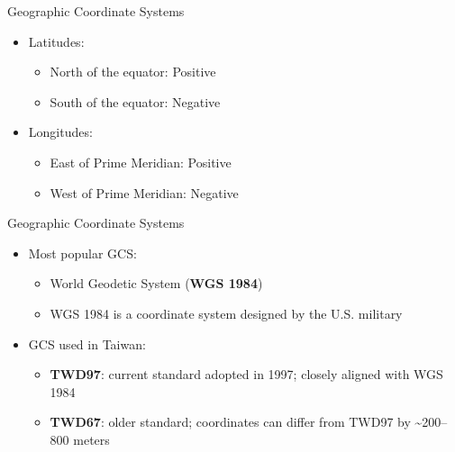 \documentclass[dvipsnames,hyperref={pdfpagelabels=false}]{beamer}
\begin{document}
\begin{frame}{Geographic Coordinate Systems}
	\begin{itemize}
		
		\item Latitudes:
		\vspace{0.2cm}
		\begin{itemize}
			\item North of the equator: Positive
			\vspace{0.2cm}
			\item South of the equator: Negative
		\end{itemize}
		\vspace{0.2cm}
		\item Longitudes:
		\vspace{0.2cm}
		\begin{itemize}
			\item East of Prime Meridian: Positive
			\vspace{0.2cm}
			\item West of Prime Meridian: Negative
		\end{itemize}
		
	\end{itemize}
\end{frame}
 
 
 
 
\begin{frame}{Geographic Coordinate Systems}
	\begin{itemize}
		
		\item Most popular GCS: 
		\begin{itemize}
			\vspace{0.2cm}
			\item World Geodetic System (\textbf{WGS 1984})
			\vspace{0.2cm}
			\item WGS 1984 is a coordinate system designed by the U.S. military
		\end{itemize}
		\vspace{0.2cm}
		\item GCS used in Taiwan:
		\vspace{0.2cm}
		\begin{itemize}
			\item \textbf{TWD97}: current standard adopted in 1997; closely aligned with WGS 1984 
			\vspace{0.2cm}
			\item \textbf{TWD67}: older standard; coordinates can differ from TWD97 by \textasciitilde{}200--800 meters 
		\end{itemize}
		
	\end{itemize}
\end{frame}
 
\end{document}
